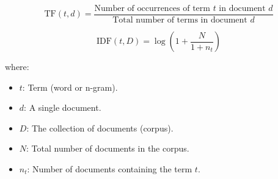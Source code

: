 \[
    \text{TF}(t, d) = \frac{\text{Number of occurrences of term } t \text{ in document } d}{\text{Total number of terms in document } d}
\]

\[
    \text{IDF}(t, D) = \log\left(1 + \frac{N}{1 + n_t}\right)
\]

where:
\begin{itemize}
    \item \(t\): Term (word or n-gram).
    \item \(d\): A single document.
    \item \(D\): The collection of documents (corpus).
    \item \(N\): Total number of documents in the corpus.
    \item \(n_t\): Number of documents containing the term \(t\).
\end{itemize}
